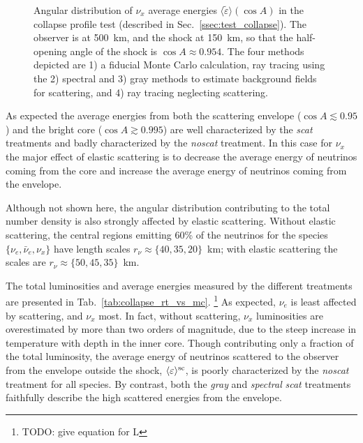 \documentclass[aps,floatfix,prd,superscriptaddress,twocolumn]{revtex4-1}
\begin{document}
\begin{figure}
  \resizebox{\columnwidth}{!}{}
  \caption{Angular distribution of $\nu_x$ average energies
    $\langle\tilde{\varepsilon}\rangle(\cos A)$
    in the collapse profile test (described in Sec.~\ref{ssec:test_collapse}).
    The observer is at 500~km, and the shock at 150~km,
    so that the half-opening angle of the shock is $\cos A\approx0.954$.
    The four methods depicted are 1) a fiducial Monte Carlo calculation,
    ray tracing using the 2) spectral and 3) gray methods to estimate background
    fields for scattering, and 4) ray tracing neglecting scattering.
  }
  \label{fig:avg_eps_collapse}
\end{figure}

As expected the average energies from both
the scattering envelope ($\cos A \lesssim 0.95$) and
the bright core ($\cos A\gtrsim 0.995 $)
are well characterized by the \emph{scat} treatments
and badly characterized by the \emph{noscat} treatment.
In this case for $\nu_x$ the major effect of elastic scattering
is to decrease the average energy of neutrinos coming from the core
and increase the average energy of neutrinos coming from the envelope.

Although not shown here, the angular distribution contributing to the
total number density is also strongly affected by elastic scattering.
Without elastic scattering, the central regions emitting 60\%
of the neutrinos for the species $\{\nu_e,\bar{\nu}_e,\nu_x\}$
have length scales $r_\nu\approx\{40,35,20\}$~km;
with elastic scattering the scales are
$r_\nu\approx\{50,45,35\}$~km.

The total luminosities and average energies
measured by the different treatments are
presented in Tab.~\ref{tab:collapse_rt_vs_mc}.
\footnote{TODO: give equation for L}
As expected, $\nu_e$ is least affected by scattering, and $\nu_x$ most.
In fact, without scattering, $\nu_x$ luminosities are overestimated by more than
two orders of magnitude, due to the steep increase in temperature with depth
in the inner core.
Though contributing only a fraction of the total luminosity,
the average energy of neutrinos scattered to the observer from the envelope
outside the shock, $\langle\varepsilon\rangle^{\rm sc}$,
is poorly characterized by the \emph{noscat} treatment for all species.
By contrast, both the \emph{gray} and \emph{spectral} \emph{scat} treatments
faithfully describe the high scattered energies from the envelope.
\end{document}
